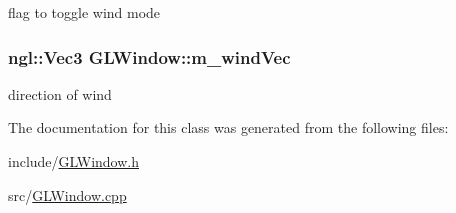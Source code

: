 flag to toggle wind mode \hypertarget{classGLWindow_a7fcaf061ce8a5f9c8ecef97a06e1e6c9}{
\subsubsection[{m\_\-windVec}]{\setlength{\rightskip}{0pt plus 5cm}ngl::Vec3 {\bf GLWindow::m\_\-windVec}}}
\label{classGLWindow_a7fcaf061ce8a5f9c8ecef97a06e1e6c9}


direction of wind 

The documentation for this class was generated from the following files:\begin{DoxyCompactItemize}
\item 
include/\hyperlink{GLWindow_8h}{GLWindow.h}\item 
src/\hyperlink{GLWindow_8cpp}{GLWindow.cpp}\end{DoxyCompactItemize}
